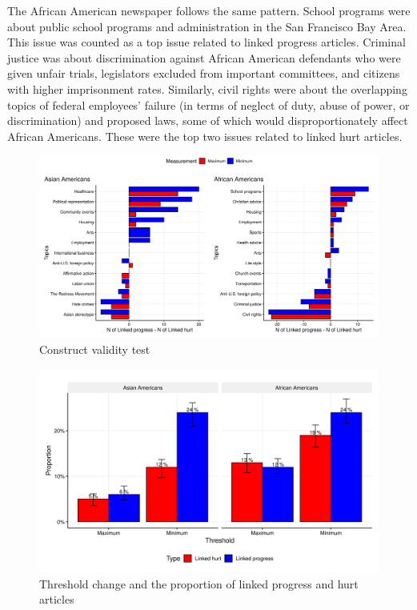 \documentclass[12 pt]{article}
\begin{document}
The African American newspaper follows the same pattern. School programs were about public school programs and administration in the San Francisco Bay Area. This issue was counted as a top issue related to linked progress articles. Criminal justice was about discrimination against African American defendants who were given unfair trials, legislators excluded from important committees, and citizens with higher imprisonment rates. Similarly, civil rights were about the overlapping topics of federal employees' failure (in terms of neglect of duty, abuse of power, or discrimination) and proposed laws, some of which would disproportionately affect African Americans. These were the top two issues related to linked hurt articles.

\begin{figure}[htbp!]
    \centering
    \includegraphics[width = 1\linewidth]{content_analysis_topics_gran.png}
    \caption{Construct validity test}
    \label{fig:construct_validity_test}
\end{figure}

\begin{figure}[htbp!]
    \centering
    \includegraphics[width=0.9\linewidth]{content_data_sources_sub.png}
    \caption{Threshold change and the proportion of linked progress and hurt articles}
    \label{fig:content_case_proportion}
\end{figure}
\end{document}
